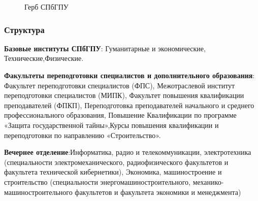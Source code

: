 \documentclass[fullscreen=true, bookmarks=false]{beamer}
\begin{document}
\begin{frame}
\begin{figure}[b]
\noindent{}
  \caption{Герб СПбГПУ}

\end{figure}
\end{frame}

\begin{frame}
\frametitle{Структура}
\textbf{Базовые институты СПбГПУ}: Гуманитарные и экономические, Технические,Физические.\par
\textbf{Факультеты переподготовки специалистов и дополнительного образования}: Факультет переподготовки специалистов (ФПС), Межотраслевой институт переподготовки специалистов (МИПК), Факультет повышения квалификации преподавателей (ФПКП), Переподготовка преподавателей начального и среднего профессионального образования, Повышение Квалификации по программе «Защита государственной тайны»,Курсы повышения квалификации и переподготовки по направлению «Строительство».\par
\textbf{Вечернее отделение}:Информатика, радио и телекоммуникации, электротехника (специальности электромеханического, радиофизического факультетов и факультета технической кибернетики), Экономика, машиностроение и строительство (специальности энергомашиностроительного, механико-машиностроительного факультетов и факультета экономики и менеджмента)
\pause\\
\end{frame}
\end{document}
